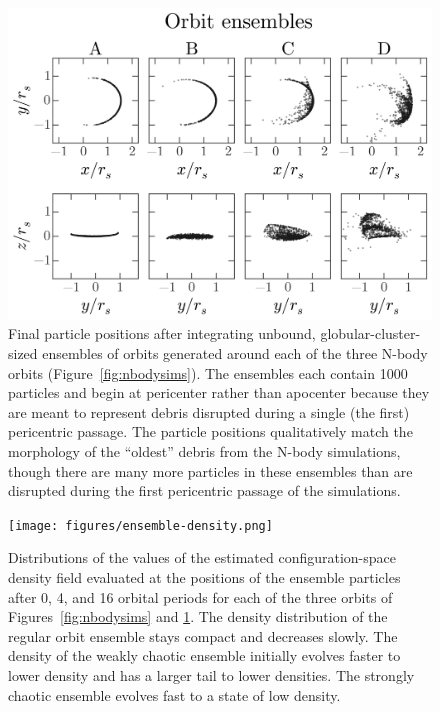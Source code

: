 \documentclass[letterpaper,12pt,preprint]{aastex}
\begin{document}
\begin{figure}[p]
\begin{center}
\includegraphics[width=\textwidth]{figures/ensembles.png}
\caption{Final particle positions after integrating unbound, globular-cluster-sized ensembles of orbits generated around each of the three N-body orbits (Figure~\ref{fig:nbodysims}). The ensembles each contain 1000 particles and begin at pericenter rather than apocenter because they are meant to represent debris disrupted during a single (the first) pericentric passage. The particle positions qualitatively match the morphology of the ``oldest'' debris from the N-body simulations, though there are many more particles in these ensembles than are disrupted during the first pericentric passage of the simulations. } \label{fig:ensembles}
\end{center}
\end{figure}

\clearpage
\begin{figure}[p]
\begin{center}
\texttt{[image: figures/ensemble-density.png]}
\caption{ Distributions of the values of the estimated configuration-space density field evaluated at the positions of the ensemble particles after 0, 4, and 16 orbital periods for each of the three orbits of Figures~\ref{fig:nbodysims} and \ref{fig:ensembles}. The density distribution of the regular orbit ensemble stays compact and decreases slowly. The density of the weakly chaotic ensemble initially evolves faster to lower density and has a larger tail to lower densities. The strongly chaotic ensemble evolves fast to a state of low density.} \label{fig:ensemble-density}
\end{center}
\end{figure}
\end{document}
